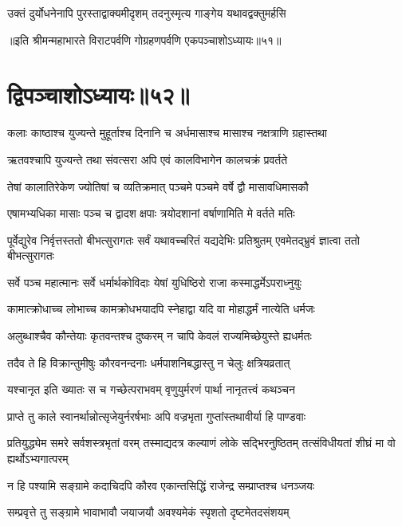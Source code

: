\twolineshloka
{उक्तं दुर्योधनेनापि पुरस्ताद्वाक्यमीदृशम्}
{तदनुस्मृत्य गाङ्गेय यथावद्वक्तुमर्हसि}

॥इति श्रीमन्महाभारते विराटपर्वणि गोग्रहणपर्वणि एकपञ्चाशोऽध्यायः॥५१॥

\chapter{द्विपञ्चाशोऽध्यायः॥५२॥}

\twolineshloka
{कलाः काष्ठाश्च युज्यन्ते मुहूर्ताश्च दिनानि च}
{अर्धमासाश्च मासाश्च नक्षत्राणि ग्रहास्तथा}


\twolineshloka
{ऋतवश्चापि युज्यन्ते तथा संवत्सरा अपि}
{एवं कालविभागेन कालचक्रं प्रवर्तते}


\twolineshloka
{तेषां कालातिरेकेण ज्योतिषां च व्यतिक्रमात्}
{पञ्चमे पञ्चमे वर्षे द्वौ मासावधिमासकौ}


\twolineshloka
{एषामभ्यधिका मासाः पञ्च च द्वादश क्षपाः}
{त्रयोदशानां वर्षाणामिति मे वर्तते मतिः}


\onelineshloka
{पूर्वेद्युरेव निर्वृत्तस्ततो बीभत्सुरागतः}
\twolineshloka
{सर्वं यथावच्चरितं यद्यदेभिः प्रतिश्रुतम्}
{एवमेतद्भ्रुवं ज्ञात्वा ततो बीभत्सुरागतः}


\twolineshloka
{सर्वे पञ्च महात्मानः सर्वे धर्मार्थकोविदाः}
{येषां युधिष्ठिरो राजा कस्माद्धर्मेऽपराध्नुयुः}


\twolineshloka
{कामात्क्रोधाच्च लोभाच्च कामक्रोधभयादपि}
{स्नेहाद्वा यदि वा मोहाद्धर्मं नात्येति धर्मजः}


\twolineshloka
{अलुब्धाश्चैव कौन्तेयाः कृतवन्तश्च दुष्करम्}
{न चापि केवलं राज्यमिच्छेयुस्ते ह्यधर्मतः}


\twolineshloka
{तदैव ते हि विक्रान्तुमीषुः कौरवनन्दनाः}
{धर्मपाशनिबद्धास्तु न चेलुः क्षत्रियव्रतात्}


\twolineshloka
{यश्चानृत इति ख्यातः स च गच्छेत्पराभवम्}
{वृणुयुर्मरणं पार्था नानृतत्त्वं कथञ्चन}


\twolineshloka
{प्राप्ते तु काले स्वानर्थान्नोत्सृजेयुर्नरर्षभाः}
{अपि वज्रभृता गुप्तांस्तथावीर्या हि पाण्डवाः}


\onelineshloka
{प्रतियुद्ध्येम समरे सर्वशस्त्रभृतां वरम्}
\twolineshloka
{तस्माद्यदत्र कल्याणं लोके सद्भिरनुष्ठितम्}
{तत्संविधीयतां शीघ्रं मा वो ह्यर्थोऽभ्यगात्परम्}


\twolineshloka
{न हि पश्यामि सङ्ग्रामे कदाचिदपि कौरव}
{एकान्तसिद्धिं राजेन्द्र सम्प्राप्तश्च धनञ्जयः}


\twolineshloka
{सम्प्रवृत्ते तु सङ्ग्रामे भावाभावौ जयाजयौ}
{अवश्यमेकं स्पृशतो दृष्टमेतदसंशयम्}



